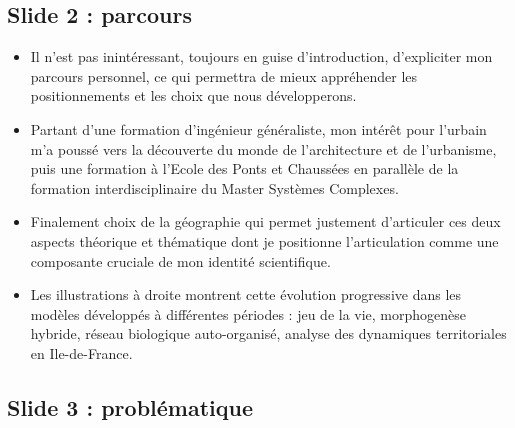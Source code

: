 \documentclass[11pt]{article}
\begin{document}
\subsection*{Slide 2 : parcours}


\begin{itemize}
	\item Il n'est pas inintéressant, toujours en guise d'introduction, d'expliciter mon parcours personnel, ce qui permettra de mieux appréhender les positionnements et les choix que nous développerons.
	\item Partant d'une formation d'ingénieur généraliste, mon intérêt pour l'urbain m'a poussé vers la découverte du monde de l'architecture et de l'urbanisme, puis une formation à l'Ecole des Ponts et Chaussées en parallèle de la formation interdisciplinaire du Master Systèmes Complexes.
	\item Finalement choix de la géographie qui permet justement d'articuler ces deux aspects théorique et thématique dont je positionne l'articulation comme une composante cruciale de mon identité scientifique.
	\item Les illustrations à droite montrent cette évolution progressive dans les modèles développés à différentes périodes : jeu de la vie, morphogenèse hybride, réseau biologique auto-organisé, analyse des dynamiques territoriales en Ile-de-France.
\end{itemize}


\subsection*{Slide 3 : problématique}
\end{document}

